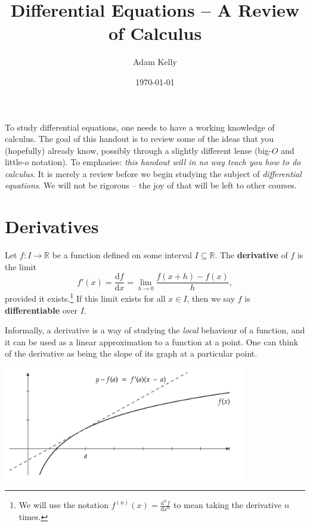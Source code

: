 \documentclass[a4paper]{scrartcl}
\newcommand{\vocab}[1]{\textbf{\color{MidnightBlue} #1}}
\newcommand{\dd}{\mathrm{d}}
\newcommand{\R}{\mathbb{R}}
\begin{document}
\title{Differential Equations -- A Review of Calculus}
\author{Adam Kelly}
\date{\today}

\maketitle

To study differential equations, one needs to have a working knowledge of calculus. The goal of this handout is to review some of the ideas that you (hopefully) already know, possibly through a slightly different lense (big-$O$ and little-$o$ notation). 
To emphasise: \emph{this handout will in no way teach you how to do calculus}. It is merely a review before we begin studying the subject of \emph{differential equations}. We will not be rigorous -- the joy of that will be left to other courses. 
 
\section*{Derivatives}

\begin{definition}[Derivative]
	Let $f: I \rightarrow \R$ be a function defined on some interval $I \subseteq \R$. The \vocab{derivative} of $f$ 
	is the limit
	$$
	f'(x) = \frac{\dd f}{\dd x} = \lim_{h \to 0} \frac{f(x + h) - f(x)}{h},
	$$
	provided it exists.\footnote{We will use the notation $f^{(n)}(x) = \frac{\dd^n f}{\dd x^n}$ to mean taking the derivative $n$ times.}
	If this limit exists for all $x \in I$, then we say $f$ is \vocab{differentiable} over $I$. 
\end{definition}

Informally, a derivative is a way of studying the \emph{local} behaviour of a function, and it can be used as a linear approximation to a function at a point. One can think of the derivative as being the slope of its graph at a particular point.
\begin{center}
	\includegraphics[width=0.8\textwidth]{tangent}
\end{center}
\end{document}
